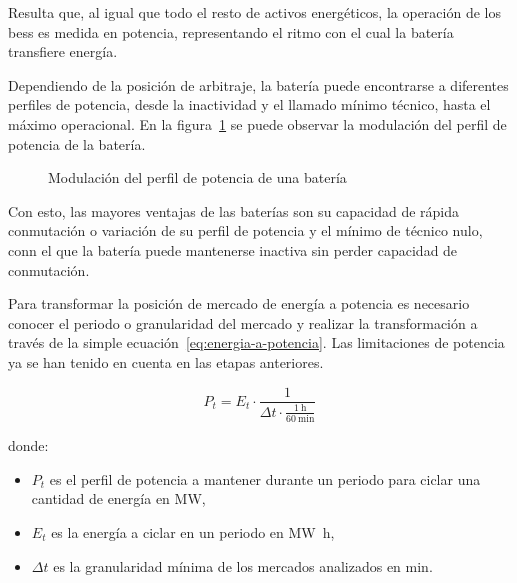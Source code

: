 Resulta que, al igual que todo el resto de activos energéticos, la operación de los \gls{bess} es medida en potencia, representando el ritmo con el cual la batería transfiere energía.

Dependiendo de la posición de arbitraje, la batería puede encontrarse a diferentes perfiles de potencia, desde la inactividad y el llamado mínimo técnico, hasta el máximo operacional. En la figura~\ref{fig:perfil-potencia} se puede observar la modulación del perfil de potencia de la batería.

\begin{figure}
  \centering
  \caption{Modulación del perfil de potencia de una batería}
  \label{fig:perfil-potencia}
\end{figure}

Con esto, las mayores ventajas de las baterías son su capacidad de rápida conmutación o variación de su perfil de potencia y el mínimo de técnico nulo, conn el que la batería puede mantenerse inactiva sin perder capacidad de conmutación.

Para transformar la posición de mercado de energía a potencia es necesario conocer el periodo o granularidad del mercado y realizar la transformación a través de la simple ecuación~\ref{eq:energia-a-potencia}. Las limitaciones de potencia ya se han tenido en cuenta en las etapas anteriores.

\begin{equation}
  \label{eq:energia-a-potencia}
  P_{t} = E_{t} \cdot \frac{1}{\Delta t \cdot \frac{\SI{1}{\hour}}{\SI{60}{\minute}}}
\end{equation}

donde:

\begin{itemize}

  \item \( P_{t} \) es el perfil de potencia a mantener durante un periodo para ciclar una cantidad de energía en \si{\mega\watt},

  \item \( E_{t} \) es la energía a ciclar en un periodo en \si{{\mega\watt\hour}},

  \item \( \Delta t \) es la granularidad mínima de los mercados analizados en \si{\minute}.

\end{itemize}

